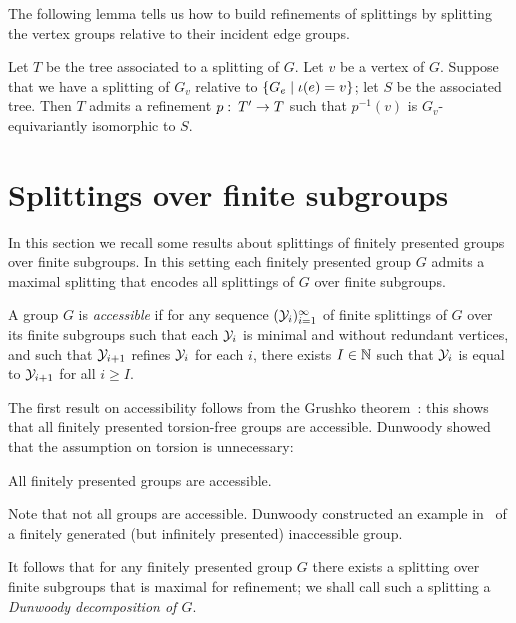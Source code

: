 The following lemma tells us how to build refinements of splittings by splitting the vertex groups relative to their incident edge groups.

\begin{lemma}\cite[Lemma 4.12]{guirardellevitt17}\label{lemma:refinement_by_blowing_up}
  Let $T$ be the tree associated to a splitting of $G$.
  Let $v$ be a vertex of $G$.
  Suppose that we have a splitting of $G_v$ relative to $\{G_e \mid \operatorname{\iota}(e) = v\}$; let $S$ be the associated tree.
  Then $T$ admits a refinement $p \operatorname{\colon} T' \to T$ such that $p^{-1}(v)$ is $G_v$-equivariantly isomorphic to $S$.
\end{lemma}

\section{Splittings over finite subgroups}

In this section we recall some results about splittings of finitely presented groups over finite subgroups.
In this setting each finitely presented group $G$ admits a maximal splitting that encodes all splittings of $G$ over finite subgroups.

\begin{definition}
  A group $G$ is \emph{accessible} if for any sequence $(\mathcal{Y}_i)_{i=1}^\infty$ of finite splittings of $G$ over its finite subgroups such that each $\mathcal{Y}_i$ is minimal and without redundant vertices, and such that $\mathcal{Y}_{i+1}$ refines $\mathcal{Y}_i$ for each $i$, there exists $I \in \mathbb{N}$ such that $\mathcal{Y}_i$ is equal to $\mathcal{Y}_{i+1}$ for all $i \geq I$.
\end{definition}

The first result on accessibility follows from the Grushko theorem~\cite{grushko40}: this shows that all finitely presented torsion-free groups are accessible.
Dunwoody showed that the assumption on torsion is unnecessary:

\begin{theorem}\cite{dunwoody85}
  All finitely presented groups are accessible.
\end{theorem}

\begin{remark}
  Note that not all groups are accessible.
  Dunwoody constructed an example in~\cite{dunwoody93} of a finitely generated (but infinitely presented) inaccessible group.
\end{remark}

It follows that for any finitely presented group $G$ there exists a splitting over finite subgroups that is maximal for refinement; we shall call such a splitting a \emph{Dunwoody decomposition of $G$}.

